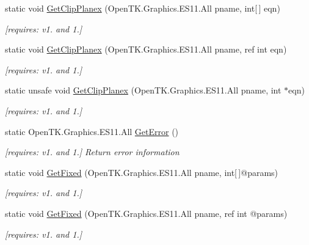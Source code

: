 \begin{DoxyCompactItemize}
static void \hyperlink{class_open_t_k_1_1_graphics_1_1_e_s11_1_1_g_l_a27f85171209a018acc732ac133ca3bc3}{Get\-Clip\-Planex} (Open\-T\-K.\-Graphics.\-E\-S11.\-All pname, int\mbox{[}$\,$\mbox{]} eqn)
\begin{DoxyCompactList}\small\item\em \mbox{[}requires\-: v1. and 1.\mbox{]}\end{DoxyCompactList}\item 
static void \hyperlink{class_open_t_k_1_1_graphics_1_1_e_s11_1_1_g_l_a3256037a34245dda4b3aad2d6f711aee}{Get\-Clip\-Planex} (Open\-T\-K.\-Graphics.\-E\-S11.\-All pname, ref int eqn)
\begin{DoxyCompactList}\small\item\em \mbox{[}requires\-: v1. and 1.\mbox{]}\end{DoxyCompactList}\item 
static unsafe void \hyperlink{class_open_t_k_1_1_graphics_1_1_e_s11_1_1_g_l_a4735f27514b8d49c088649b83bf9f7d0}{Get\-Clip\-Planex} (Open\-T\-K.\-Graphics.\-E\-S11.\-All pname, int $\ast$eqn)
\begin{DoxyCompactList}\small\item\em \mbox{[}requires\-: v1. and 1.\mbox{]}\end{DoxyCompactList}\item 
static Open\-T\-K.\-Graphics.\-E\-S11.\-All \hyperlink{class_open_t_k_1_1_graphics_1_1_e_s11_1_1_g_l_a301a1458e452ea18e3ef0e9705bc9406}{Get\-Error} ()
\begin{DoxyCompactList}\small\item\em \mbox{[}requires\-: v1. and 1.\mbox{]} Return error information \end{DoxyCompactList}\item 
static void \hyperlink{class_open_t_k_1_1_graphics_1_1_e_s11_1_1_g_l_a61e31d01398be466a3279637012785f2}{Get\-Fixed} (Open\-T\-K.\-Graphics.\-E\-S11.\-All pname, int\mbox{[}$\,$\mbox{]}@params)
\begin{DoxyCompactList}\small\item\em \mbox{[}requires\-: v1. and 1.\mbox{]}\end{DoxyCompactList}\item 
static void \hyperlink{class_open_t_k_1_1_graphics_1_1_e_s11_1_1_g_l_a6f57c082aebff9590905b921eae9d0e8}{Get\-Fixed} (Open\-T\-K.\-Graphics.\-E\-S11.\-All pname, ref int @params)
\begin{DoxyCompactList}\small\item\em \mbox{[}requires\-: v1. and 1.\mbox{]}\end{DoxyCompactList}\item 

\end{DoxyCompactItemize}
